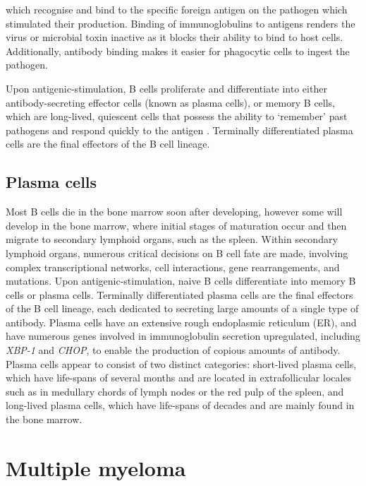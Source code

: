 which recognise and bind to the specific foreign antigen on the pathogen which stimulated their production.
Binding of immunoglobulins to antigens renders the virus or microbial toxin inactive as it blocks their ability to bind to host cells.
Additionally, antibody binding makes it easier for phagocytic cells to ingest the pathogen.

Upon antigenic-stimulation, B cells proliferate and differentiate into either antibody-secreting effector cells (known as plasma cells), or memory B cells, which are long-lived, quiescent cells that possess the ability to `remember' past pathogens and respond quickly to the antigen \cite{palm2019remembrance}.
Terminally differentiated plasma cells are the final effectors of the B cell lineage.


\subsection{Plasma cells}
Most B cells die in the bone marrow soon after developing, however some will develop in the bone marrow, where initial stages of maturation occur and then migrate to secondary lymphoid organs, such as the spleen.
Within secondary lymphoid organs, numerous critical decisions on B cell fate are made, involving complex transcriptional networks, cell interactions, gene rearrangements, and mutations\cite{roth2014tracking, jourdan2011characterization}.
Upon antigenic-stimulation, naive B cells differentiate into memory B cells or plasma cells.
Terminally differentiated plasma cells are the final effectors of the B cell lineage, each dedicated to secreting large amounts of a single type of antibody.
Plasma cells have an extensive rough endoplasmic reticulum (ER), and have numerous genes involved in immunoglobulin secretion upregulated, including \textit{XBP-1} and \textit{CHOP}\cite{shapiro2004plasma}, to enable the production of copious amounts of antibody.
Plasma cells appear to consist of two distinct categories: short-lived plasma cells, which have life-spans of several months and are located in extrafollicular locales such as in medullary chords of lymph nodes or the red pulp of the spleen, and long-lived plasma cells, which have life-spans of decades and are mainly found in the bone marrow\cite{bortnick2013and, andraud2012living}.


\section{Multiple myeloma}\label{sec:MM}
